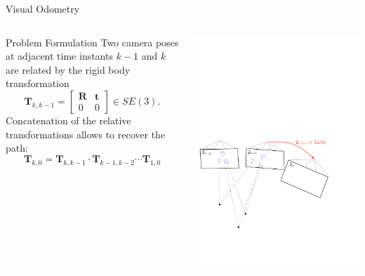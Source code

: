 \documentclass[10pt]{beamer}
\newcommand{\sVec}[1]{\begin{bmatrix} #1 \end{bmatrix}}
\newcommand{\T}{\mathbf{T}}
\begin{document}
\begin{frame}{Visual Odometry}
	\begin{columns}
	  \begin{column}{0.4\textwidth}
	  	\begin{block}{Problem Formulation}
	  		Two camera poses at adjacent time instants $k-1$ and $k$ are related by the rigid body transformation
	  		\[
				\T_{k,k-1} = \sVec{\mathbf{R} & \mathbf{t} \\ 0 & 0} \in SE(3).
	  		\]
	  		Concatenation of the relative transformations allows to recover the path:
	  		\[
	  			\T_{k,0} = \T_{k,k-1} \cdot \T_{k-1, k-2} \cdots \T_{1, 0}
	  		\]

		\end{block}
	  \end{column}
	  \begin{column}{0.6\textwidth}
	    \includegraphics[width=\textwidth]{img/vo_pipeline_2}
	  \end{column}
	\end{columns}
\end{frame}
\end{document}
